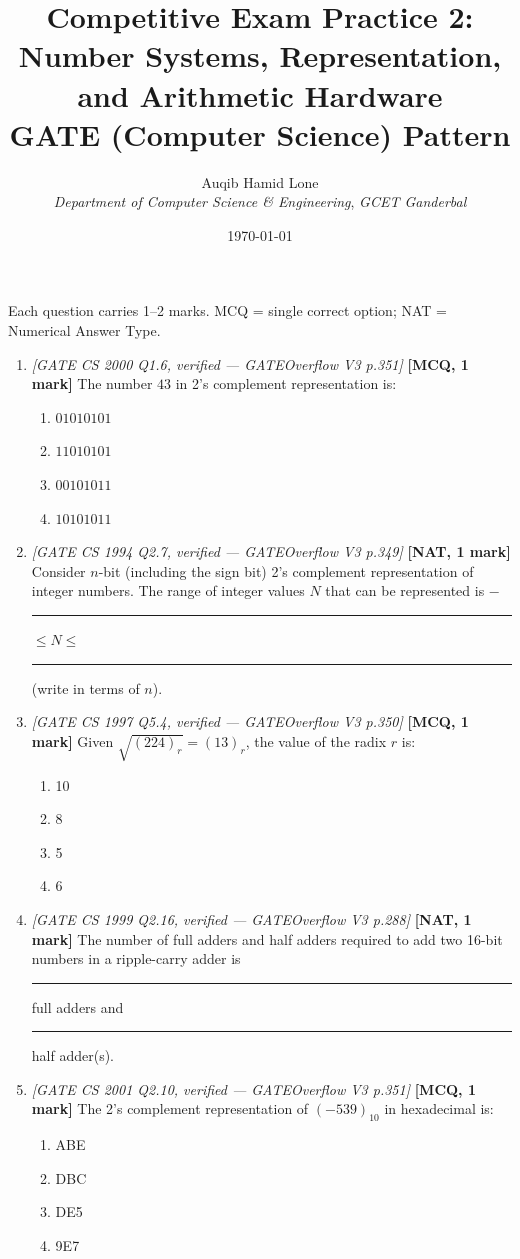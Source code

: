 \documentclass[11pt]{article}
\title{Competitive Exam Practice 2: Number Systems, Representation, and Arithmetic Hardware\\\large GATE (Computer Science) Pattern}
\author{Auqib Hamid Lone\\[0.3em]
  \emph{Department of Computer Science \& Engineering}, \emph{GCET Ganderbal}}
\date{\today}
\begin{document}
\maketitle

\noindent Each question carries 1--2 marks. MCQ = single correct option; NAT = Numerical Answer Type.

\begin{enumerate}
\item[\textbf{Q1}] \textit{[GATE CS 2000 Q1.6, verified --- GATEOverflow V3 p.351]} \textbf{[MCQ, 1 mark]} The number $43$ in 2's complement representation is:
\begin{enumerate}
  \item[(A)] $01010101$
  \item[(B)] $11010101$
  \item[(C)] $00101011$
  \item[(D)] $10101011$
\end{enumerate}

\item[\textbf{Q2}] \textit{[GATE CS 1994 Q2.7, verified --- GATEOverflow V3 p.349]} \textbf{[NAT, 1 mark]} Consider $n$-bit (including the sign bit) 2's complement representation of integer numbers. The range of integer values $N$ that can be represented is $-$ \rule{1.5cm}{0.4pt} $\le N \le$ \rule{1.5cm}{0.4pt} (write in terms of $n$).

\item[\textbf{Q3}] \textit{[GATE CS 1997 Q5.4, verified --- GATEOverflow V3 p.350]} \textbf{[MCQ, 1 mark]} Given $\sqrt{(224)_r} = (13)_r$, the value of the radix $r$ is:
\begin{enumerate}
  \item[(A)] 10
  \item[(B)] 8
  \item[(C)] 5
  \item[(D)] 6
\end{enumerate}

\item[\textbf{Q4}] \textit{[GATE CS 1999 Q2.16, verified --- GATEOverflow V3 p.288]} \textbf{[NAT, 1 mark]} The number of full adders and half adders required to add two 16-bit numbers in a ripple-carry adder is \rule{1.5cm}{0.4pt} full adders and \rule{1.5cm}{0.4pt} half adder(s).

\item[\textbf{Q5}] \textit{[GATE CS 2001 Q2.10, verified --- GATEOverflow V3 p.351]} \textbf{[MCQ, 1 mark]} The 2's complement representation of $(-539)_{10}$ in hexadecimal is:
\begin{enumerate}
  \item[(A)] ABE
  \item[(B)] DBC
  \item[(C)] DE5
  \item[(D)] 9E7
\end{enumerate}


\end{enumerate}
\end{document}
